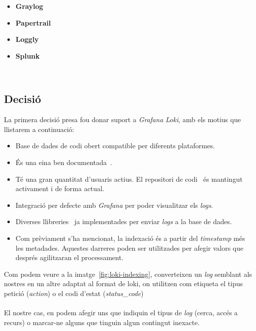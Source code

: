 \begin{itemize}
    \item \textbf{Graylog}~\cite{graylog}
    \item \textbf{Papertrail}~\cite{papertrail}
    \item \textbf{Loggly}~\cite{loggly}
    \item \textbf{Splunk}~\cite{splunk}
\end{itemize}

\noindent \\
\subsection{Decisió}\label{subsec:log-db-decision}

\noindent
La primera decisió presa fou donar suport a \textit{Grafana Loki}, amb els motius que llistarem a continuació:

\begin{itemize}
    \item Base de dades de codi obert compatible per diferents plataformes.
    \item És una eina ben documentada~\cite{loki:documentation}.
    \item Té una gran quantitat d’usuaris actius.
    El repositori de codi~\cite{loki:code} és mantingut activament i de forma actual.
    \item Integració per defecte amb \textit{Grafana} per poder visualitzar els \textit{logs}.
    \item Diverses llibreries~\cite{loki:libraries} ja implementades per enviar \textit{\gls{log}s} a la base de dades.
    \item Com prèviament s’ha mencionat, la indexació és a partir del \textit{\gls{timestamp}} més les metadades.
    Aquestes darreres poden ser utilitzades per afegir valors que després agilitzaran el processament. \\
\end{itemize}

\noindent
Com podem veure a la imatge~\ref{fig:loki-indexing}, converteixen un \textit{\gls{log}} semblant als nostres en un altre adaptat al format de loki, on utilitzen com etiqueta el tipus petició (\textit{action}) o el codi d’estat (\textit{status\_code}) \\ \\
El nostre cas, en podem afegir uns que indiquin el tipus de \textit{\gls{log}} (cerca, accés a recurs) o marcar-ne alguns que tinguin algun contingut inexacte.

